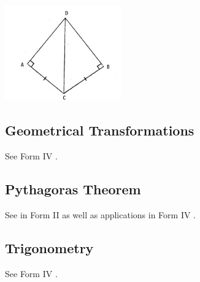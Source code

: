 \begin{enumerate}
	\begin{center}
	\includegraphics[width=5cm]{./img/sim6.jpg}
	\end{center}
	
\end{enumerate}	

	\subsection{Geometrical Transformations}
	
	See Form IV .

	\subsection{Pythagoras Theorem}
	
	See  in Form II  as well as applications in Form IV .
	
	\subsection{Trigonometry}
	
	See Form IV .
	
